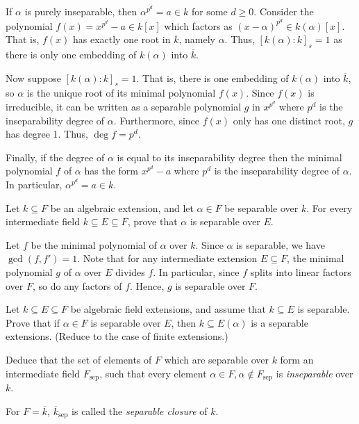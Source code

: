 \documentclass[../../master.tex]{subfiles}
\begin{document}
\begin{solution}
    If $\alpha$ is purely inseparable, then $\alpha^{p^{d}} = a \in k$ for some $d \geq 0$.
    Consider the polynomial $f(x) = x^{p^{d}} - a \in k[x]$ which factors as $(x - \alpha)^{p^{d}} \in k(\alpha)[x]$.
    That is, $f(x)$ has exactly one root in $\overline{k}$, namely $\alpha$.
    Thus, $[k(\alpha) : k]_s = 1$ as there is only one embedding of $k(\alpha)$ into $\overline{k}$.

    Now suppose $[k(\alpha) : k]_s = 1$.
    That is, there is one embedding of $k(\alpha)$ into $\overline{k}$, so $\alpha$ is the unique root of its minimal polynomial $f(x)$.
    Since $f(x)$ is irreducible, it can be written as a separable polynomial $g$ in $x^{p^{d}}$ where $p^{d}$ is the inseparability degree of $\alpha$.
    Furthermore, since $f(x)$ only has one distinct root, $g$ has degree 1.
    Thus, $\deg f = p^{d}$.

    Finally, if the degree of $\alpha$ is equal to its inseparability degree then the minimal polynomial $f$ of $\alpha$ has the form $x^{p^{d}} - a$ where $p^{d}$ is the inseparability degree of $\alpha$.
    In particular, $\alpha^{p^{d}} = a \in k$.
\end{solution}

\begin{problem}
    Let $k \subseteq F$ be an algebraic extension, and let $\alpha \in F$ be separable over $k$.
    For every intermediate field $k \subseteq E \subseteq F$, prove that $\alpha$ is separable over $E$.
\end{problem}

\begin{solution}
    Let $f$ be the minimal polynomial of $\alpha$ over $k$.
    Since $\alpha$ is separable, we have $\gcd(f, f') = 1$.
    Note that for any intermediate extension $E \subseteq F$, the minimal polynomial $g$ of $\alpha$ over $E$ divides $f$.
    In particular, since $f$ splits into linear factors over $F$, so do any factors of $f$.
    Hence, $g$ is separable over $F$.
\end{solution}

\begin{problem}
    Let $k \subseteq E \subseteq F$ be algebraic field extensions, and assume that $k \subseteq E$ is separable.
    Prove that if $\alpha \in F$ is separable over $E$, then $k \subseteq E(\alpha)$ is a separable extensions.
    (Reduce to the case of finite extensions.)

    Deduce that the set of elements of $F$ which are separable over $k$ form an intermediate field $F_{\text{sep}}$, such that every element $\alpha \in F, \alpha \notin F_{\text{sep}}$ is \textit{inseparable} over $k$.

    For $F = \overline{k}$, $\overline{k}_{\text{sep}}$ is called the \textit{separable closure} of $k$.
\end{problem}
\end{document}
